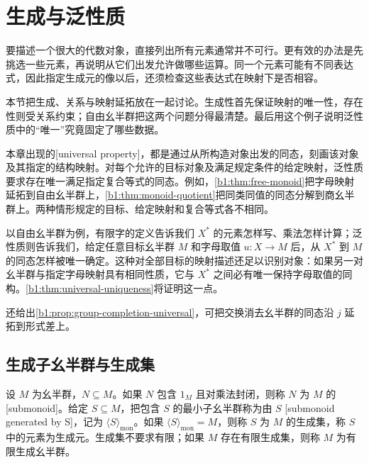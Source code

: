 
\section{生成与泛性质}
\label{b1:sec:0104}

%
%
%

要描述一个很大的代数对象，直接列出所有元素通常并不可行。更有效的办法是先挑选一些元素，再说明从它们出发允许做哪些运算。同一个元素可能有不同表达式，因此指定生成元的像以后，还须检查这些表达式在映射下是否相容。

\ProseParagraphBreak
本节把生成、关系与映射延拓放在一起讨论。生成性首先保证映射的唯一性，存在性则受关系约束；自由幺半群把这两个问题分得最清楚。最后用这个例子说明泛性质中的“唯一”究竟固定了哪些数据。

\begin{remark}[泛性质的含义]\label{b1:def:universal-property}
	本章出现的[universal property]，都是通过从所构造对象出发的同态，刻画该对象及其指定的结构映射。对每个允许的目标对象及满足规定条件的给定映射，泛性质要求存在唯一满足指定复合等式的同态。例如，\cref{b1:thm:free-monoid}把字母映射延拓到自由幺半群上，\cref{b1:thm:monoid-quotient}把同类同值的同态分解到商幺半群上。两种情形规定的目标、给定映射和复合等式各不相同。

	以自由幺半群为例，有限字的定义告诉我们 \(X^*\) 的元素怎样写、乘法怎样计算；泛性质则告诉我们，给定任意目标幺半群 \(M\) 和字母取值 \(u:X\rightarrow M\) 后，从 \(X^*\) 到 \(M\) 的同态怎样被唯一确定。这种对全部目标的映射描述还足以识别对象：如果另一对幺半群与指定字母映射具有相同性质，它与 \(X^*\) 之间必有唯一保持字母取值的同构。\cref{b1:thm:universal-uniqueness}将证明这一点。

	还给出\cref{b1:prop:group-completion-universal}，可把交换消去幺半群的同态沿 \(j\) 延拓到形式差上。
\end{remark}

\subsection{生成子幺半群与生成集}
\label{b1:subsec:0104:01}

\begin{definition}\label{b1:def:generated-monoid}
	设 \(M\) 为幺半群，\(N\subseteq M\)。如果 \(N\) 包含 \(1_M\) 且对乘法封闭，则称 \(N\) 为 \(M\) 的[submonoid]。给定 \(S\subseteq M\)，把包含 \(S\) 的最小子幺半群称为由 \(S\) [submonoid generated by S]，记为 \(\langle S\rangle_{\mathrm{mon}}\)。如果 \(\langle S\rangle_{\mathrm{mon}}=M\)，则称 \(S\) 为 \(M\) 的生成集，称 \(S\) 中的元素为生成元。生成集不要求有限；如果 \(M\) 存在有限生成集，则称 \(M\) 为有限生成幺半群。
\end{definition}

